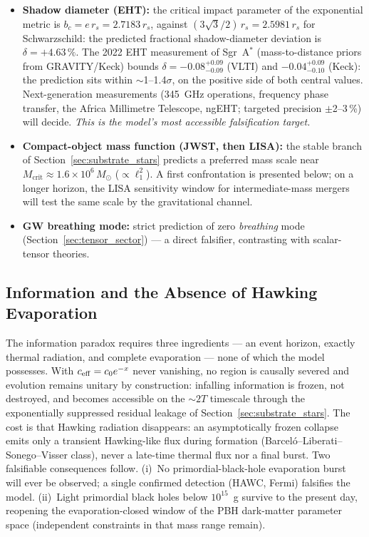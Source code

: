 \documentclass[11pt,a4paper]{article}
\theoremstyle{plain}
\theoremstyle{remark}
\begin{document}
\begin{itemize}
    \item \textbf{Shadow diameter (EHT):} the critical impact parameter of the exponential metric is $b_c = e\,r_s = 2.7183\,r_s$, against $(3\sqrt{3}/2)\,r_s = 2.5981\,r_s$ for Schwarzschild: the predicted fractional shadow-diameter deviation is $\delta = +4.63\,\%$. The 2022 EHT measurement of Sgr~A$^*$ (mass-to-distance priors from GRAVITY/Keck) bounds $\delta = -0.08^{+0.09}_{-0.09}$ (VLTI) and $-0.04^{+0.09}_{-0.10}$ (Keck): the prediction sits within $\sim$1--1.4$\sigma$, on the positive side of both central values. Next-generation measurements (345~GHz operations, frequency phase transfer, the Africa Millimetre Telescope, ngEHT; targeted precision $\pm$2--3\,\%) will decide. \emph{This is the model's most accessible falsification target.}
    \item \textbf{Compact-object mass function (JWST, then LISA):} the stable branch of Section~\ref{sec:substrate_stars} predicts a preferred mass scale near $M_{\text{crit}} \approx 1.6\times10^{6}\,M_\odot$ ($\propto \ell_1^2$). A first confrontation is presented below; on a longer horizon, the LISA sensitivity window for intermediate-mass mergers will test the same scale by the gravitational channel.
    \item \textbf{GW breathing mode:} strict prediction of zero \emph{breathing} mode (Section~\ref{sec:tensor_sector}) --- a direct falsifier, contrasting with scalar-tensor theories.
\end{itemize}

\subsection{Information and the Absence of Hawking Evaporation}
The information paradox requires three ingredients --- an event horizon, exactly thermal radiation, and complete evaporation --- none of which the model possesses. With $c_{\rm eff} = c_0 e^{-x}$ never vanishing, no region is causally severed and evolution remains unitary by construction: infalling information is frozen, not destroyed, and becomes accessible on the $\sim 2T$ timescale through the exponentially suppressed residual leakage of Section~\ref{sec:substrate_stars}. The cost is that Hawking radiation disappears: an asymptotically frozen collapse emits only a transient Hawking-like flux during formation (Barcel\'o--Liberati--Sonego--Visser class), never a late-time thermal flux nor a final burst. Two falsifiable consequences follow. (i)~No primordial-black-hole evaporation burst will ever be observed; a single confirmed detection (HAWC, Fermi) falsifies the model. (ii)~Light primordial black holes below $10^{15}$~g survive to the present day, reopening the evaporation-closed window of the PBH dark-matter parameter space (independent constraints in that mass range remain).
\end{document}
